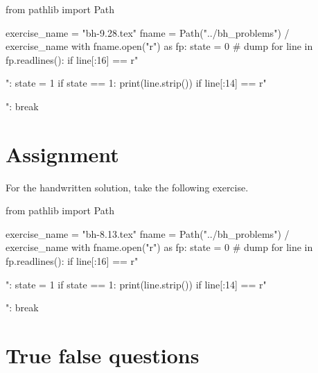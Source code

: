 \begin{pycode}
from pathlib import Path

exercise_name = "bh-9.28.tex"
fname = Path("../bh_problems") / exercise_name
with fname.open("r") as fp:
    state = 0  # dump
    for line in fp.readlines():
        if line[:16] == r"\begin{exercise}":
            state = 1
        if state == 1:
            print(line.strip())
        if line[:14] == r"\end{exercise}":
            break
\end{pycode}







\section{Assignment}
\label{sec:assignment}

For the handwritten solution, take the following exercise.

\begin{pycode}
from pathlib import Path

exercise_name = "bh-8.13.tex"
fname = Path("../bh_problems") / exercise_name
with fname.open("r") as fp:
    state = 0  # dump
    for line in fp.readlines():
        if line[:16] == r"\begin{exercise}":
            state = 1
        if state == 1:
            print(line.strip())
        if line[:14] == r"\end{exercise}":
            break
\end{pycode}






\section{True false questions}
\label{sec:true-false-questions}
\setcounter{theorem}{0}





